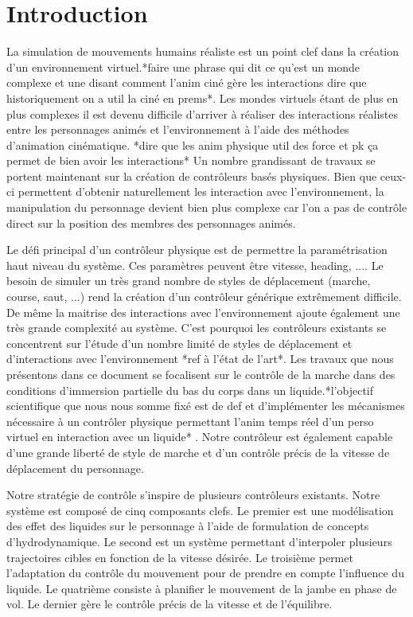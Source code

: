 \documentclass[runningheads,a4paper]{llncs}
\begin{document}
\section{Introduction}
%
La simulation de mouvements humains réaliste est un point clef dans la création d'un environnement virtuel.*faire une phrase qui dit ce qu'est un monde complexe et une disant comment l'anim ciné gère les interactions dire que historiquement on a util la ciné en prems*.   Les mondes virtuels étant de plus en plus complexes il est devenu difficile d'arriver à réaliser des interactions réalistes entre les personnages animés et l'environnement à l'aide des méthodes d'animation cinématique. *dire que les anim physique util des force et pk ça permet de bien avoir les interactions* Un nombre grandissant de travaux se portent maintenant sur la création de contrôleurs basés physiques. Bien que ceux-ci permettent d'obtenir naturellement les interaction avec l'environnement, la manipulation du personnage devient bien plus complexe car l'on a pas de contrôle direct sur la position des membres des personnages animés.

Le défi principal d'un contrôleur physique est de permettre la paramétrisation haut niveau du système. Ces paramètres peuvent être vitesse, heading, .... Le besoin de simuler un très grand nombre de styles de déplacement (marche, course, saut, ...) rend la création d'un contrôleur générique extrêmement difficile. De même la maitrise des interactions avec l'environnement ajoute également une très grande complexité au système. C'est pourquoi les contrôleurs existants se concentrent sur l'étude d'un nombre limité de styles de déplacement et d'interactions avec l'environnement *ref à l'état de l'art*. Les travaux que nous présentons dans ce document se focalisent sur le contrôle de la marche dans des conditions d'immersion partielle du bas du corps dans un liquide.*l'objectif scientifique que nous nous somme fixé est de def et d'implémenter les mécanismes nécessaire à un contrôler physique permettant l'anim temps réel d'un perso virtuel en interaction avec un liquide* . Notre contrôleur est également capable d'une grande liberté de style de marche et d'un contrôle précis de la vitesse de déplacement du personnage.

Notre stratégie de contrôle s'inspire de plusieurs contrôleurs existants. Notre système est composé de cinq composants clefs. Le premier est une modélisation des effet des liquides sur le personnage à l'aide de formulation de concepts d'hydrodynamique.
Le second est un système permettant d'interpoler plusieurs trajectoires cibles en fonction de la vitesse désirée. Le troisième permet l'adaptation du contrôle du mouvement pour de prendre en compte l'influence du liquide.  Le quatrième consiste à planifier le mouvement de la jambe en phase de vol. Le dernier gère le contrôle précis de la vitesse et de l'équilibre.
\end{document}
